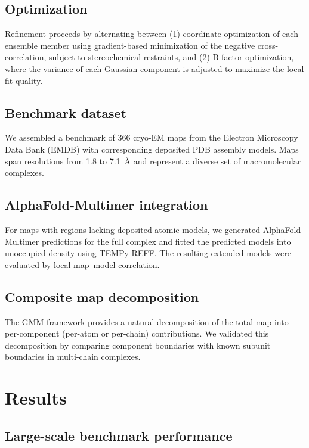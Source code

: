 \documentclass[11pt]{article}
\begin{document}
\subsection{Optimization}

Refinement proceeds by alternating between (1) coordinate optimization of each ensemble member using gradient-based minimization of the negative cross-correlation, subject to stereochemical restraints, and (2) B-factor optimization, where the variance of each Gaussian component is adjusted to maximize the local fit quality.

\subsection{Benchmark dataset}

We assembled a benchmark of 366 cryo-EM maps from the Electron Microscopy Data Bank (EMDB) with corresponding deposited PDB assembly models. Maps span resolutions from 1.8 to 7.1~\AA{} and represent a diverse set of macromolecular complexes.

\subsection{AlphaFold-Multimer integration}

For maps with regions lacking deposited atomic models, we generated AlphaFold-Multimer predictions for the full complex and fitted the predicted models into unoccupied density using TEMPy-REFF. The resulting extended models were evaluated by local map--model correlation.

\subsection{Composite map decomposition}

The GMM framework provides a natural decomposition of the total map into per-component (per-atom or per-chain) contributions. We validated this decomposition by comparing component boundaries with known subunit boundaries in multi-chain complexes.

\section{Results}

\subsection{Large-scale benchmark performance}
\end{document}
